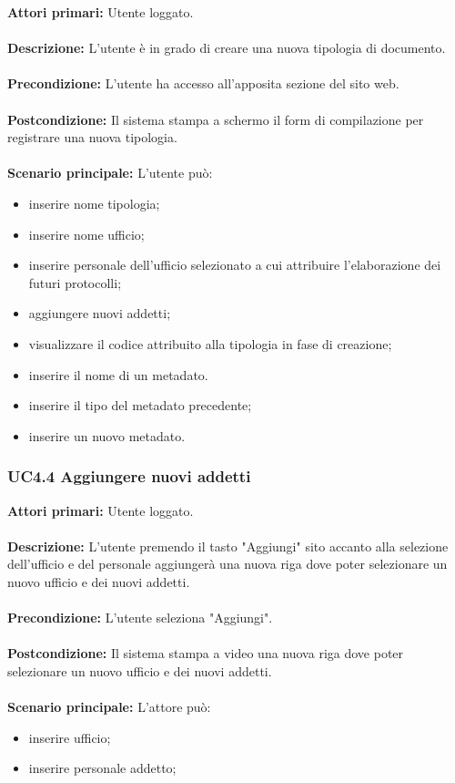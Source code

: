     \textbf{Attori primari:} Utente loggato.
    \\ 
    \\
    \textbf{Descrizione:} L'utente è in grado di creare una nuova tipologia di documento.
    \\
    \\
    \textbf{Precondizione:} L'utente ha accesso all'apposita sezione del sito web.
    \\
    \\
    \textbf{Postcondizione:} Il sistema stampa a schermo il form di compilazione per registrare una nuova tipologia.
    \\
    \\
    \textbf{Scenario principale:} L'utente può:
            \begin{itemize}
                \item inserire nome tipologia;
                \item inserire nome ufficio;
                \item inserire personale dell'ufficio selezionato a cui attribuire l'elaborazione dei futuri protocolli;
                \item aggiungere nuovi addetti;
                \item visualizzare il codice attribuito alla tipologia in fase di creazione;
                \item inserire il nome di un metadato.
                \item inserire il tipo del metadato precedente;
                \item inserire un nuovo metadato.
            \end{itemize}
            
\subsubsection{UC4.4 Aggiungere nuovi addetti}
    \label{UC4.4}
    \textbf{Attori primari:} Utente loggato.
    \\
    \\
    \textbf{Descrizione:} L'utente premendo il tasto "Aggiungi" sito accanto alla selezione dell'ufficio e del personale aggiungerà una nuova riga dove poter selezionare un nuovo ufficio e dei nuovi addetti.
    \\
    \\
    \textbf{Precondizione:} L'utente seleziona "Aggiungi".
    \\
    \\
    \textbf{Postcondizione:} Il sistema stampa a video una nuova riga dove poter selezionare un nuovo ufficio e dei nuovi addetti.
    \\
    \\
    \textbf{Scenario principale:} L'attore può:
        \begin{itemize}
                \item inserire ufficio;
                \item inserire personale addetto;
            \end{itemize}
            
